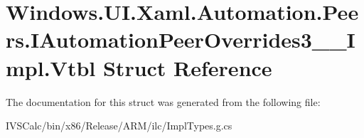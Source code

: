 \hypertarget{struct_windows_1_1_u_i_1_1_xaml_1_1_automation_1_1_peers_1_1_i_automation_peer_overrides3_____impl_1_1_vtbl}{}\section{Windows.\+U\+I.\+Xaml.\+Automation.\+Peers.\+I\+Automation\+Peer\+Overrides3\+\_\+\+\_\+\+Impl.\+Vtbl Struct Reference}
\label{struct_windows_1_1_u_i_1_1_xaml_1_1_automation_1_1_peers_1_1_i_automation_peer_overrides3_____impl_1_1_vtbl}


The documentation for this struct was generated from the following file\+:\begin{DoxyCompactItemize}
\item 
I\+V\+S\+Calc/bin/x86/\+Release/\+A\+R\+M/ilc/Impl\+Types.\+g.\+cs\end{DoxyCompactItemize}
